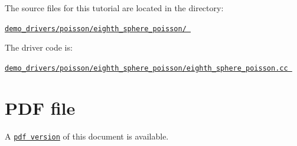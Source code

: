 \begin{DoxyItemize}
\item The source files for this tutorial are located in the directory\+: \begin{center} \href{
../../../../
demo_drivers/poisson/eighth_sphere_poisson/
}{\tt demo\+\_\+drivers/poisson/eighth\+\_\+sphere\+\_\+poisson/ } \end{center} 
\item The driver code is\+: \begin{center} \href{
../../../../
demo_drivers/poisson/eighth_sphere_poisson/eighth_sphere_poisson.cc
}{\tt demo\+\_\+drivers/poisson/eighth\+\_\+sphere\+\_\+poisson/eighth\+\_\+sphere\+\_\+poisson.\+cc } \end{center} 
\end{DoxyItemize}



 

 \hypertarget{index_pdf}{}\section{P\+D\+F file}\label{index_pdf}
A \href{../latex/refman.pdf}{\tt pdf version} of this document is available. 
